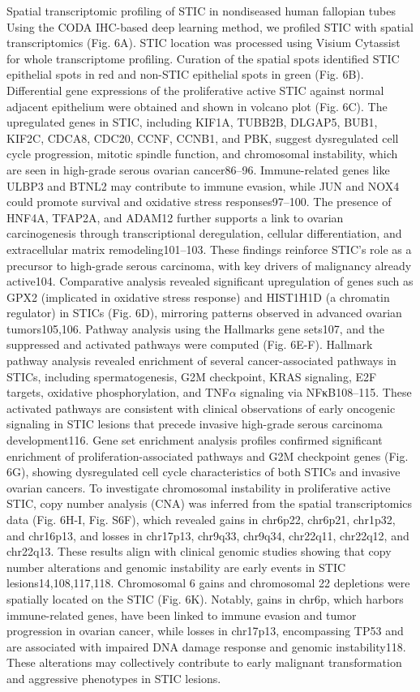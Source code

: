 \begin{refsection}
    Spatial transcriptomic profiling of STIC in nondiseased human fallopian tubes
    Using the CODA IHC-based deep learning method, we profiled STIC with spatial transcriptomics (Fig. 6A). STIC location was processed using Visium Cytassist for whole transcriptome profiling. Curation of the spatial spots identified STIC epithelial spots in red and non-STIC epithelial spots in green (Fig. 6B).
    Differential gene expressions of the proliferative active STIC against normal adjacent epithelium were obtained and shown in volcano plot (Fig. 6C). The upregulated genes in STIC, including KIF1A, TUBB2B, DLGAP5, BUB1, KIF2C, CDCA8, CDC20, CCNF, CCNB1, and PBK, suggest dysregulated cell cycle progression, mitotic spindle function, and chromosomal instability, which are seen in high-grade serous ovarian cancer86–96.  Immune-related genes like ULBP3 and BTNL2 may contribute to immune evasion, while JUN and NOX4 could promote survival and oxidative stress responses97–100. The presence of HNF4A, TFAP2A, and ADAM12 further supports a link to ovarian carcinogenesis through transcriptional deregulation, cellular differentiation, and extracellular matrix remodeling101–103. These findings reinforce STIC’s role as a precursor to high-grade serous carcinoma, with key drivers of malignancy already active104. Comparative analysis revealed significant upregulation of genes such as GPX2 (implicated in oxidative stress response) and HIST1H1D (a chromatin regulator) in STICs (Fig. 6D), mirroring patterns observed in advanced ovarian tumors105,106.
    Pathway analysis using the Hallmarks gene sets107, and the suppressed and activated pathways were computed (Fig. 6E-F). Hallmark pathway analysis revealed enrichment of several cancer-associated pathways in STICs, including spermatogenesis, G2M checkpoint, KRAS signaling, E2F targets, oxidative phosphorylation, and TNF$\alpha$ signaling via NFκB108–115. These activated pathways are consistent with clinical observations of early oncogenic signaling in STIC lesions that precede invasive high-grade serous carcinoma development116. Gene set enrichment analysis profiles confirmed significant enrichment of proliferation-associated pathways and G2M checkpoint genes (Fig. 6G), showing dysregulated cell cycle characteristics of both STICs and invasive ovarian cancers.
    To investigate chromosomal instability in proliferative active STIC, copy number analysis (CNA) was inferred from the spatial transcriptomics data (Fig. 6H-I, Fig. S6F), which revealed gains in chr6p22, chr6p21, chr1p32, and chr16p13, and losses in chr17p13, chr9q33, chr9q34, chr22q11, chr22q12, and chr22q13. These results align with clinical genomic studies showing that copy number alterations and genomic instability are early events in STIC lesions14,108,117,118. Chromosomal 6 gains and chromosomal 22 depletions were spatially located on the STIC (Fig. 6K). Notably, gains in chr6p, which harbors immune-related genes, have been linked to immune evasion and tumor progression in ovarian cancer, while losses in chr17p13, encompassing TP53 and are associated with impaired DNA damage response and genomic instability118. These alterations may collectively contribute to early malignant transformation and aggressive phenotypes in STIC lesions. 

\end{refsection}
